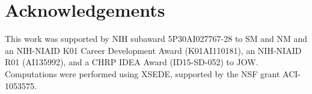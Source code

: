 \section{Acknowledgements}
This work was supported by NIH subaward 5P30AI027767-28 to SM and NM and an NIH-NIAID K01 Career Development Award (K01AI110181), an NIH-NIAID R01 (AI135992), and a \gls{CHRP} IDEA Award (ID15-SD-052) to JOW. Computations were performed using XSEDE, supported by the NSF grant ACI-1053575.

